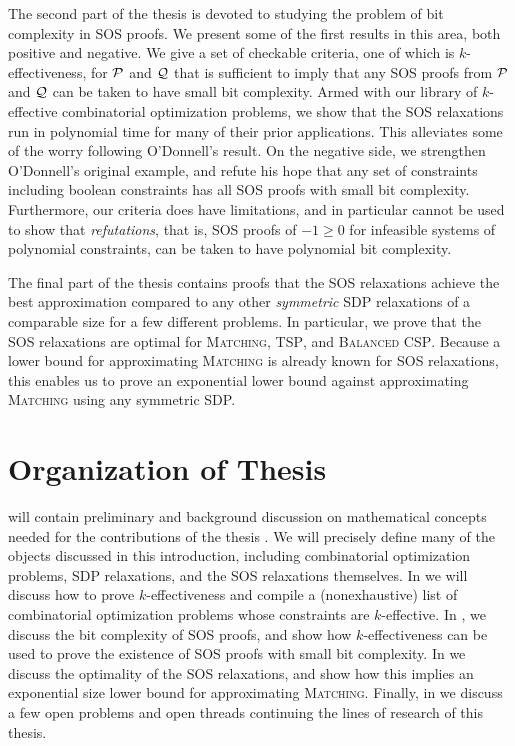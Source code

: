 The second part of the thesis is devoted to studying the problem of bit complexity in SOS proofs. We present some of the first results in this area, both positive and negative. We give a set of checkable criteria, one of which is $k$-effectiveness, for $\mathcal P$ and $\mathcal Q$ that is sufficient to imply that any SOS proofs from $\mathcal P$ and $\mathcal Q$ can be taken to have small bit complexity. Armed with our library of $k$-effective combinatorial optimization problems, we show that the SOS relaxations run in polynomial time for many of their prior applications. This alleviates some of the worry following O'Donnell's result.
On the negative side, we strengthen O'Donnell's original example, and refute his hope that any set of constraints including boolean constraints has all SOS proofs with small bit complexity.
Furthermore, our criteria does have limitations, and in particular cannot be used to show that \emph{refutations}, that is, SOS proofs of $-1 \geq 0$ for infeasible systems of polynomial constraints, can be taken to have polynomial bit complexity.

The final part of the thesis contains proofs that the SOS relaxations achieve the best approximation compared to any other \emph{symmetric} SDP relaxations of a comparable size for a few different problems. In particular, we prove that the SOS relaxations are optimal  for \textsc{Matching}, \textsc{TSP}, and \textsc{Balanced CSP}. Because a lower bound for approximating \textsc{Matching} is already known for SOS relaxations, this enables us to prove an exponential lower bound against approximating \textsc{Matching} using any symmetric SDP.

\section{Organization of Thesis}


 will contain preliminary and background discussion on mathematical concepts needed for the contributions of the thesis . We will precisely define many of the objects discussed in this introduction, including combinatorial optimization problems, SDP relaxations, and the SOS relaxations themselves. In  we will discuss how to prove $k$-effectiveness and compile a (nonexhaustive) list of combinatorial optimization problems whose constraints are $k$-effective. In , we discuss the bit complexity of SOS proofs, and show how $k$-effectiveness can be used to prove the existence of SOS proofs with small bit complexity. In  we discuss the optimality of the SOS relaxations, and show how this implies an exponential size lower bound for approximating \textsc{Matching}. Finally, in  we discuss a few open problems and open threads continuing the lines of research of this thesis.
